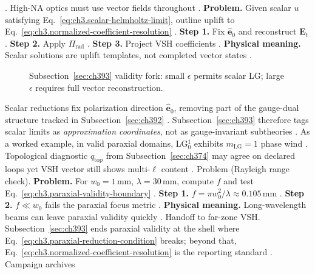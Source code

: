 \cite{allen1992}. High-NA optics must use vector fields throughout \cite{stratton1941}.
\textbf{Problem.} Given scalar \(u\) satisfying Eq.~\eqref{eq:ch3.scalar-helmholtz-limit}, outline uplift to
Eq.~\eqref{eq:ch3.normalized-coefficient-resolution} \cite{hansen1988}.
\textbf{Step 1.} Fix \(\hat{\mathbf{e}}_{0}\) and reconstruct \(\mathbf{E}_{t}\) \cite{stratton1941}.
\textbf{Step 2.} Apply \(\Pi_{\mathrm{rad}}\) \cite{harrington2001}.
\textbf{Step 3.} Project VSH coefficients \cite{hansen1988}.
\textbf{Physical meaning.} Scalar solutions are uplift templates, not completed vector states \cite{belinfante1940}.
\begin{figure}[t]
\centering
{}
\caption{Subsection~\ref{sec:ch393} validity fork: small \(\epsilon\) permits scalar LG; large \(\epsilon\) requires full vector reconstruction.}
\label{fig:ch3.393-validity-fork}
\end{figure}
Scalar reductions fix polarization direction \(\hat{\mathbf{e}}_{0}\), removing part of the gauge-dual structure tracked in
Subsection~\ref{sec:ch392} \cite{belinfante1940}. Subsection~\ref{sec:ch393} therefore tags scalar limits as
\emph{approximation coordinates}, not as gauge-invariant subtheories \cite{stratton1941}.
As a worked example, in valid paraxial domains, LG\(_{0}^{1}\) exhibits \(m_{\mathrm{LG}}=1\) phase wind \cite{allen1992}. Topological diagnostic
\(q_{\mathrm{top}}\) from Subsection~\ref{sec:ch374} may agree on declared loops yet VSH vector still shows multi-\(\ell\) content
\cite{hansen1988}.
Problem (Rayleigh range check). \textbf{Problem.} For \(w_{0}=1\,\mathrm{mm}\), \(\lambda=30\,\mathrm{mm}\), compute \(f\) and test
Eq.~\eqref{eq:ch3.paraxial-validity-boundary} \cite{jackson1999}.
\textbf{Step 1.} \(f=\pi w_{0}^{2}/\lambda\approx0.105\,\mathrm{mm}\) \cite{jackson1999}.
\textbf{Step 2.} \(f\ll w_{0}\) fails the paraxial focus metric \cite{allen1992}.
\textbf{Physical meaning.} Long-wavelength beams can leave paraxial validity quickly \cite{harrington2001}.
Handoff to far-zone VSH. Subsection~\ref{sec:ch393} ends paraxial validity at the shell where Eq.~\eqref{eq:ch3.paraxial-reduction-condition} breaks; beyond that,
Eq.~\eqref{eq:ch3.normalized-coefficient-resolution} is the reporting standard \cite{hansen1988}. Campaign archives

